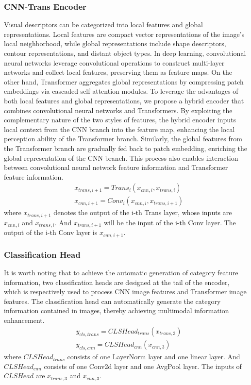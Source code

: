 \documentclass[sigconf,natbib=false]{acmart}
\begin{document}
\subsubsection{CNN-Trans Encoder}
Visual descriptors can be categorized into local features and global representations. Local features are compact vector representations of the image's local neighborhood, while global representations include shape descriptors, contour representations, and distant object types. In deep learning, convolutional neural networks leverage convolutional operations to construct multi-layer networks and collect local features, preserving them as feature maps. On the other hand, Transformer aggregates global representations by compressing patch embeddings via cascaded self-attention modules. To leverage the advantages of both local features and global representations, we propose a hybrid encoder that combines convolutional neural networks and Transformers. By exploiting the complementary nature of the two styles of features, the hybrid encoder inputs local context from the CNN branch into the feature map, enhancing the local perception ability of the Transformer branch. Similarly, the global features from the Transformer branch are gradually fed back to patch embedding, enriching the global representation of the CNN branch. This process also enables interaction between convolutional neural network feature information and Transformer feature information.
\begin{eqnarray} 
    &x_{trans,i+1} = Trans_{i}(x_{cnn,i}, x_{trans,i})
    \label{3-1.1}\\
    &x_{cnn,i+1} = Conv_{i}(x_{cnn,i}, x_{trans,i+1})
    \label{3-1.2}
\end{eqnarray}
where $x_{trans,i+1}$ denotes the output of the i-th Trans layer, whose inputs are $x_{cnn,i}$ and $x_{trans,i}$. And $x_{trans,i+1}$ will be the input of the i-th Conv layer. The output of the i-th Conv layer is $x_{cnn,i+1}$.

\subsubsection{Classification Head}
It is worth noting that to achieve the automatic generation of category feature information, two classification heads are designed at the tail of the encoder, which is respectively used to process CNN image features and Transformer image features. The classification head can automatically generate the category information contained in images, thereby achieving multimodal information enhancement.
\begin{eqnarray} 
    &y_{cls,trans} = CLSHead_{trans}(x_{trans,3})
    \label{3-1.1}\\
    &y_{cls,cnn} = CLSHead_{cnn}(x_{cnn,3})
    \label{3-1.2}
\end{eqnarray}
where $CLSHead_{trans}$ consists of one LayerNorm layer and one linear layer. And $CLSHead_{cnn}$ consists of one Conv2d layer and one AvgPool layer. The inputs of $CLSHead$ are $x_{trans,3}$ and $x_{cnn,3}$.
\end{document}
